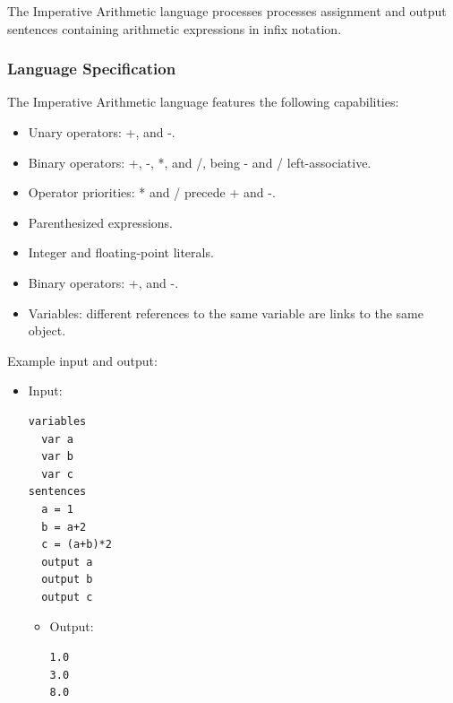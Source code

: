 \documentclass[a4paper,twoside,onecolumn]{article}
\newcommand{\pb}{\newpage}
\newcommand{\empt}{\pb \thispagestyle{empty} \rule[0mm]{0mm}{0mm} \pb}
\begin{document}
The Imperative Arithmetic language processes processes assignment and output sentences containing arithmetic expressions in infix notation.

\subsubsection{Language Specification}
The Imperative Arithmetic language features the following capabilities:

\begin{itemize}
\item Unary operators: +, and -.
\item Binary operators: +, -, *, and /, being - and / left-associative.
\item Operator priorities: * and / precede + and -.
\item Parenthesized expressions.
\item Integer and floating-point literals.
\item Binary operators: +, and -.
\item Variables: different references to the same variable are links to the same object.
\end{itemize}

Example input and output:

\begin{itemize}
\item Input:
\begin{verbatim}
variables
  var a
  var b
  var c
sentences
  a = 1
  b = a+2
  c = (a+b)*2
  output a
  output b
  output c
\end{verbatim}
\begin{itemize} \item Output:
\begin{verbatim}
1.0
3.0
8.0
\end{verbatim}
\end{itemize}
\end{itemize}

%
%

\end{document}
